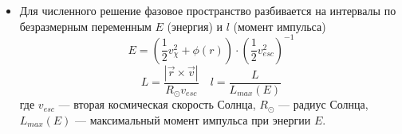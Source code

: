 \begin{itemize}
	\item Для численного решение фазовое пространство разбивается на интервалы по безразмерным переменным $E$ (энергия) и $l$ (момент импульса)
	\begin{equation*}
			E = \left(\frac{1}{2} v_{\chi}^2 + \phi(r)\right)\cdot
			\left(\frac{1}{2} v_{esc}^2 \right)^{-1} 
	\end{equation*}		
	\begin{equation*}
			L = \frac{|\vec{r} \times \vec{v}|}
			{R_{\odot} v_{esc}} \quad l = \frac{L}{L_{max}(E)}
	\end{equation*}
	где $v_{esc}$ --- вторая космическая скорость Солнца, $R_{\odot}$ --- радиус Солнца, $L_{max}(E)$ --- максимальный момент импульса при энергии $E$.
\end{itemize}